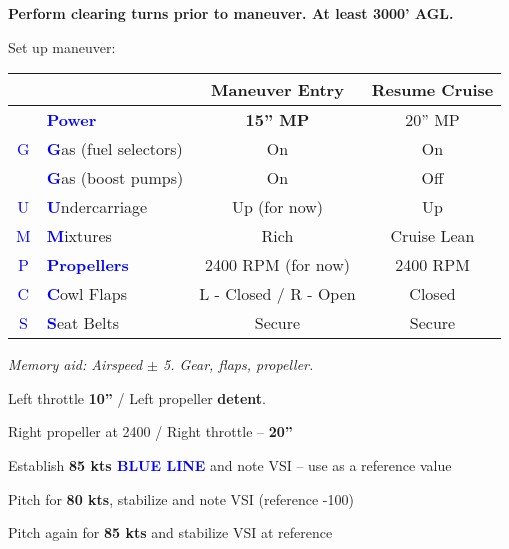 \textbf{Perform clearing turns prior to maneuver. At least 3000' AGL.}

Set up maneuver:

\begin{table}[H]
\centering
\begin{tabular}{|c|l|c|c|}
\hline
                    &                                                 & \textbf{Maneuver Entry} & \textbf{Resume Cruise} \\ \hline
                    & \textcolor{blue}{\textbf{Power}}                & \textbf{15'' MP}        & 20'' MP                \\ \hline
\textcolor{blue}{G} & \textcolor{blue}{\textbf{G}}as (fuel selectors) & On                      & On                     \\
                    & \textcolor{blue}{\textbf{G}}as (boost pumps)    & On                      & Off                    \\ \hline
\textcolor{blue}{U} & \textcolor{blue}{\textbf{U}}ndercarriage        & Up (for now)            & Up                     \\ \hline
\textcolor{blue}{M} & \textcolor{blue}{\textbf{M}}ixtures             & Rich                    & Cruise Lean            \\ \hline
\textcolor{blue}{P} & \textcolor{blue}{\textbf{Propellers}}           & 2400 RPM (for now)      & 2400 RPM               \\ \hline
\textcolor{blue}{C} & \textcolor{blue}{\textbf{C}}owl Flaps           & L - Closed / R - Open   & Closed                 \\ \hline
\textcolor{blue}{S} & \textcolor{blue}{\textbf{S}}eat Belts           & Secure                  & Secure                 \\ \hline
\end{tabular}
\end{table}

\emph{Memory aid: Airspeed $\pm$ 5. Gear, flaps, propeller.}

Left throttle \textbf{10''} / Left propeller \textbf{detent}.

Right propeller at 2400 / Right throttle – \textbf{20''}

Establish \vyse \textbf{85 kts \textcolor{blue}{BLUE LINE}} and note VSI – use as a reference value

Pitch for \textbf{80 kts}, stabilize and note VSI (reference -100)

Pitch again for \textbf{85 kts} and stabilize VSI at reference

